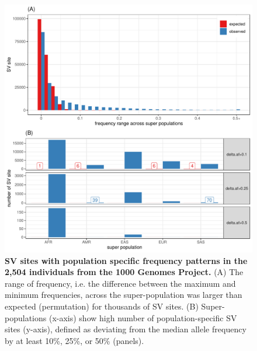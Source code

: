 \documentclass[11pt]{ucscthesis}
\begin{document}
\begin{figure}[p]
  \includegraphics[width=\linewidth]{fig-pops-freq-kgp.pdf}
  \caption[SV sites with population specific frequency patterns in the 2,504 individuals from the 1000 Genomes Project]{{\bf SV sites with population specific frequency patterns in the 2,504 individuals from the 1000 Genomes Project. }
    (A) The range of frequency, i.e. the difference between the maximum and minimum frequencies, across the super-population was larger than expected (permutation) for thousands of SV sites.
    (B) Super-populations (x-axis) show high number of population-specific SV sites (y-axis), defined as deviating from the median allele frequency by at least 10\%, 25\%, or 50\% (panels).}
  \label{fig:1kgp-pop-freq}
\end{figure}
\end{document}
